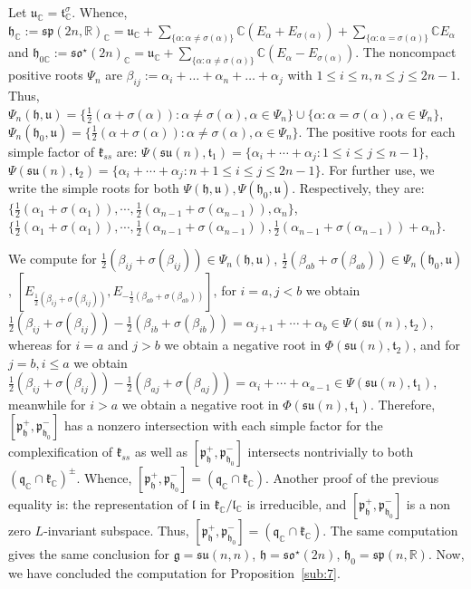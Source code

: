 \documentclass[12pt]{amsart}
\theoremstyle{definition}
\theoremstyle{remark}
\newcommand{\g}{\mathfrak{g}}
\newcommand{\h}{\mathfrak{h}}
\renewcommand{\k}{{\mathfrak k}}
\renewcommand{\l}{\mathfrak l}
\newcommand{\p}{\mathfrak p}
\newcommand{\q}{\mathfrak q}
\renewcommand{\t}{{\mathfrak t}}
\renewcommand{\u}{{\mathfrak u}}
\newcommand{\C}{{\mathbb C}}
\newcommand{\R}{{\mathbb R}}
\numberwithin{equation}{section}
\begin{document}
   Let $\u_\mathbb C=\t_\mathbb C^\sigma$. Whence,  $\h_\C:=\mathfrak{sp}(2n,\R)_\C =\u_\mathbb C +\sum_{\{\alpha :\alpha\not= \sigma(\alpha)\}} \C (E_\alpha +E_{\sigma(\alpha)})+ \sum_{\{\alpha :\alpha= \sigma(\alpha)\} } \C E_\alpha$ and $\h_{0\C}:=\mathfrak{so}^\star(2n)_\C=\u_\mathbb C +\sum_{\{\alpha :\alpha\not= \sigma(\alpha)\}} \C (E_\alpha -E_{\sigma(\alpha)})$. The noncompact positive roots $\Psi_n$ are $\beta_{ij} :=\alpha_i +\dots +\alpha_n +\dots +\alpha_j$ with $1\leq i \leq n, n\leq j \leq 2n-1$. Thus, $\Psi_n{(\h, \u)}=\{\frac12(\alpha +\sigma(\alpha)): \alpha \not=\sigma(\alpha), \alpha \in \Psi_n\} \cup \{\alpha: \alpha = \sigma(\alpha), \alpha \in \Psi_n\}$, $\Psi_n{(\h_0,\u)}=\{\frac12(\alpha +\sigma(\alpha)): \alpha \not=\sigma(\alpha), \alpha \in  \Psi_n\}$. The positive roots for each simple factor of $\k_{ss}$ are:  $\Psi(\mathfrak{su}(n), \t_1)=\{ \alpha_i +\cdots +\alpha_j : 1\leq i \leq j \leq n-1\}$, $\Psi(\mathfrak{su}(n), \t_2)=\{ \alpha_i +\cdots +\alpha_j : n+1\leq i \leq j \leq 2n-1\}$.  For further use, we write the simple roots for both $\Psi (\h, \u), \Psi (\h_0, \u)$. Respectively, they are: $\{ \frac12 (\alpha_1 +\sigma(\alpha_1)), \cdots, \frac12(\alpha_{n-1} +\sigma(\alpha_{n-1})),\alpha_n\}$,  $\{ \frac12 (\alpha_1 +\sigma(\alpha_1)), \cdots, \frac12(\alpha_{n-1} +\sigma(\alpha_{n-1})), \frac12(\alpha_{n-1} +\sigma(\alpha_{n-1})) +\alpha_n\}$.

 We compute for $\frac12 (\beta_{ij}+\sigma(\beta_{ij})) \in \Psi_n (\h, \u)$, $\frac12 (\beta_{ab}+\sigma(\beta_{ab})) \in   \Psi_n (\h_0, \u)$, $[E_{ \frac12 (\beta_{ij}+\sigma(\beta_{ij})) }, E_{-\frac12 (\beta_{ab}+\sigma(\beta_{ab}))}]$, for $i=a, j<b$ we obtain $\frac12 (\beta_{ij}+\sigma(\beta_{ij}))-\frac12 (\beta_{ib}+\sigma(\beta_{ib}))=\alpha_{j+1}+\cdots +\alpha_b \in \Psi(\mathfrak{su}(n), \t_2)$, whereas for $i=a $ and $j>b$ we obtain a negative root in $\Phi(\mathfrak{su}(n), \t_2)$, and for $j=b, i\leq a$ we obtain $\frac12 (\beta_{ij}+\sigma(\beta_{ij}))-\frac12 (\beta_{aj}+\sigma(\beta_{aj}))=\alpha_{i}+\cdots +\alpha_{a-1} \in \Psi(\mathfrak{su}(n), \t_1)$, meanwhile for $i>a$ we obtain a negative root in $\Phi(\mathfrak{su}(n), \t_1)$. Therefore, $[\p_\h^+,\p_{\h_0}^-]$ has a nonzero intersection with each simple factor for the complexification of $ \k_{ss}$ as well as   $[\p_\h^+,\p_{\h_0}^-]$ intersects nontrivially to both $(\q_\C \cap \k_\C)^\pm$. Whence,  $[\p_\h^+,\p_{\h_0}^-]=(\q_\C \cap \k_\C)$.  Another proof of the previous equality is: the representation of $\l$ in $\k_\C/\l_\C$ is irreducible, and  $[\p_\h^+,\p_{\h_0}^-]$ is a non zero $L$-invariant subspace. Thus, $[\p_\h^+,\p_{\h_0}^-]=(\q_\C \cap \k_\C)$. The same computation gives the same conclusion for $\g=\mathfrak{su}(n,n)$, $\h= \mathfrak{so}^\star(2n  )$, $\h_0= \mathfrak{sp} (n,\R)$.   Now,
we have concluded  the computation for Proposition~\ref{sub:7}.
\end{document}
